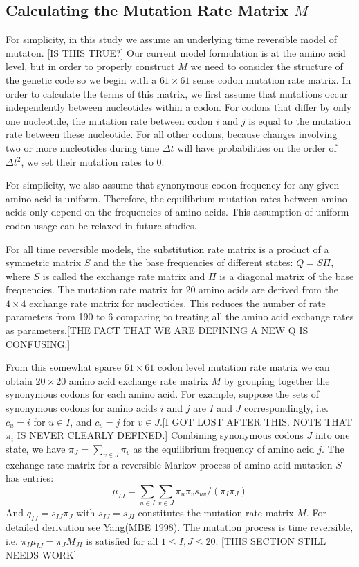 \documentclass[13pt]{article}
\begin{document}
\subsection*{Calculating the Mutation Rate Matrix $M$}
For simplicity, in this study we assume an underlying time reversible model of mutaton. [IS THIS TRUE?]
Our current model formulation is at the amino acid level, but in order to properly construct $M$ we need to consider the structure of the genetic code so we begin with a $61 \times 61$ sense codon mutation rate matrix.
In order to calculate the terms of this matrix, we first assume that mutations occur independently between nucleotides within a codon.
For codons that differ by only one nucleotide, the mutation rate between codon $i$ and $j$ is equal to the mutation rate between these nucleotide.
For all other codons, because changes involving two or more nucleotides during time $\Delta t$ will have probabilities on the order of $\Delta t^2$, we set their mutation rates to 0.

For simplicity, we also assume that synonymous codon frequency for any given amino acid is uniform.
Therefore, the equilibrium mutation rates between amino acids only depend on the frequencies of amino acids.
This assumption of uniform codon usage can be relaxed in future studies.


For all time reversible models, the substitution rate matrix is a product of a symmetric matrix $S$ and the the base frequencies of different states: $Q = S\Pi$, where $S$ is called the exchange rate matrix and $\Pi$ is a diagonal matrix of the base frequencies.
The mutation rate matrix for 20 amino acids are derived from the $4 \times 4 $ exchange rate matrix for nucleotides.
This reduces the number of rate parameters from 190 to 6 comparing to treating all the amino acid exchange rates as parameters.[THE FACT THAT WE ARE DEFINING A NEW Q IS CONFUSING.]

From this somewhat sparse $61 \times 61$ codon level mutation rate matrix we can obtain $20 \times 20$ amino acid exchange rate matrix $M$ by grouping together the synonymous codons for each amino acid.
For example, suppose the sets of synonymous codons for amino acids $i$ and $j$ are $I$ and $J$ correspondingly, i.e. $c_u = i$ for $u \in I$, and $c_v = j$ for $v \in J$.[I GOT LOST AFTER THIS. NOTE THAT $\pi_i$ IS NEVER CLEARLY DEFINED.]
Combining synonymous codons $J$ into one state, we have $\pi_J = \sum_{v \in J} \pi_v$ as the equilibrium frequency of amino acid $j$.
The exchange rate matrix for a reversible Markov process of amino acid mutation $S$ has entries:
\[\mu_{IJ} = \sum_{u \in I} \sum_{v \in J} \pi_u \pi_v s_{uv} / (\pi_I \pi_J)\]
\noindent
And $q_{IJ} = s_{IJ} \pi_J$ with $s_{IJ}  = s_{JI}$ constitutes the mutation rate matrix $M$.
For detailed derivation see Yang(MBE 1998).
The mutation process is time reversible, i.e. $\pi_I \mu_{IJ} = \pi_J M_{JI}$ is satisfied for all $1 \leq I,J \leq 20$.
[THIS SECTION STILL NEEDS WORK]
\end{document}
